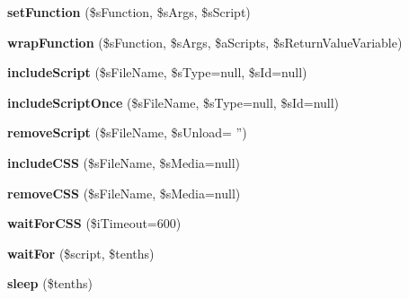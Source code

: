 \begin{DoxyCompactItemize}
\item 
\hypertarget{classxajaxResponse_a7b8d29910093b585869aa921d9ebf3a1}{
{\bfseries setFunction} (\$sFunction, \$sArgs, \$sScript)}
\label{classxajaxResponse_a7b8d29910093b585869aa921d9ebf3a1}

\item 
\hypertarget{classxajaxResponse_ac559875d3216220bdd9ddec09699ea51}{
{\bfseries wrapFunction} (\$sFunction, \$sArgs, \$aScripts, \$sReturnValueVariable)}
\label{classxajaxResponse_ac559875d3216220bdd9ddec09699ea51}

\item 
\hypertarget{classxajaxResponse_acf8b09e73ac3ef743fd5a16c2de91ae6}{
{\bfseries includeScript} (\$sFileName, \$sType=null, \$sId=null)}
\label{classxajaxResponse_acf8b09e73ac3ef743fd5a16c2de91ae6}

\item 
\hypertarget{classxajaxResponse_aa167b3a5e91635772f9dcc917ffd373b}{
{\bfseries includeScriptOnce} (\$sFileName, \$sType=null, \$sId=null)}
\label{classxajaxResponse_aa167b3a5e91635772f9dcc917ffd373b}

\item 
\hypertarget{classxajaxResponse_ad2ba4cb15ccda6c4402bd288012195cf}{
{\bfseries removeScript} (\$sFileName, \$sUnload= '')}
\label{classxajaxResponse_ad2ba4cb15ccda6c4402bd288012195cf}

\item 
\hypertarget{classxajaxResponse_a409de8ddcd7d30fb96367ac06e8cb733}{
{\bfseries includeCSS} (\$sFileName, \$sMedia=null)}
\label{classxajaxResponse_a409de8ddcd7d30fb96367ac06e8cb733}

\item 
\hypertarget{classxajaxResponse_a3be180096f97a8bb1774bf728a44a3bd}{
{\bfseries removeCSS} (\$sFileName, \$sMedia=null)}
\label{classxajaxResponse_a3be180096f97a8bb1774bf728a44a3bd}

\item 
\hypertarget{classxajaxResponse_ac1f7cead4b77a1db6ebaf7b1260228f7}{
{\bfseries waitForCSS} (\$iTimeout=600)}
\label{classxajaxResponse_ac1f7cead4b77a1db6ebaf7b1260228f7}

\item 
\hypertarget{classxajaxResponse_a74bf21fec03b7d8feed1be30ecd61747}{
{\bfseries waitFor} (\$script, \$tenths)}
\label{classxajaxResponse_a74bf21fec03b7d8feed1be30ecd61747}

\item 
\hypertarget{classxajaxResponse_aefa5ebb3dcad67312c6a5c5bd9990b68}{
{\bfseries sleep} (\$tenths)}
\label{classxajaxResponse_aefa5ebb3dcad67312c6a5c5bd9990b68}


\end{DoxyCompactItemize}
